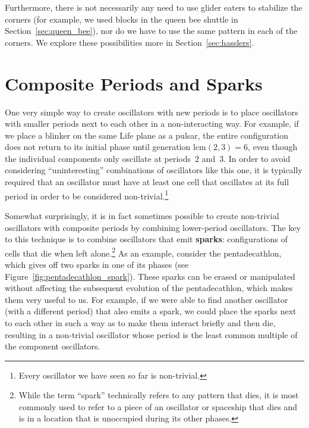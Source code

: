 Furthermore, there is not necessarily any need to use glider eaters to stabilize the corners (for example, we used blocks in the queen bee shuttle in Section~\ref{sec:queen_bee}), nor do we have to use the same pattern in each of the corners. We explore these possibilities more in Section~\ref{sec:hasslers}.


\section{Composite Periods and Sparks}\label{sec:composite_periods}

One very simple way to create oscillators with new periods is to place oscillators with smaller periods next to each other in a non-interacting way. For example, if we place a blinker on the same Life plane as a pulsar, the entire configuration does not return to its initial phase until generation $\mathrm{lcm}(2,3) = 6$, even though the individual components only oscillate at periods~$2$ and~$3$. In order to avoid considering ``uninteresting'' combinations of oscillators like this one, it is typically required that an oscillator must have at least one cell that oscillates at its full period in order to be considered non-trivial.\footnote{Every oscillator we have seen so far is non-trivial.}

Somewhat surprisingly, it is in fact sometimes possible to create non-trivial oscillators with composite periods by combining lower-period oscillators. The key to this technique is to combine oscillators that emit \textbf{sparks}: configurations of cells that die when left alone.\footnote{While the term ``spark'' technically refers to any pattern that dies, it is most commonly used to refer to a piece of an oscillator or spaceship that dies and is in a location that is unoccupied during its other phases.} As an example, consider the pentadecathlon, which gives off two sparks in one of its phases (see Figure~\ref{fig:pentadecathlon_spark}). These sparks can be erased or manipulated without affecting the subsequent evolution of the pentadecathlon, which makes them very useful to us. For example, if we were able to find another oscillator (with a different period) that also emits a spark, we could place the sparks next to each other in such a way as to make them interact briefly and then die, resulting in a non-trivial oscillator whose period is the least common multiple of the component oscillators.

